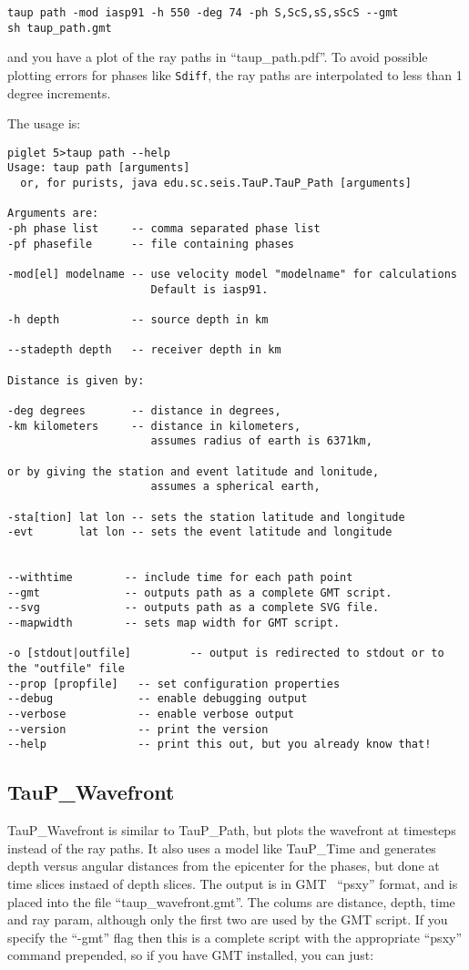 \begin{verbatim}
taup path -mod iasp91 -h 550 -deg 74 -ph S,ScS,sS,sScS --gmt
sh taup_path.gmt
\end{verbatim}

and you have a plot of the ray paths in ``taup\_path.pdf''. To avoid possible plotting errors for
phases like \texttt{Sdiff}, the ray paths are interpolated to less than
1 degree increments.

The usage is:
\begin{verbatim}
piglet 5>taup path --help
Usage: taup path [arguments]
  or, for purists, java edu.sc.seis.TauP.TauP_Path [arguments]

Arguments are:
-ph phase list     -- comma separated phase list
-pf phasefile      -- file containing phases

-mod[el] modelname -- use velocity model "modelname" for calculations
                      Default is iasp91.

-h depth           -- source depth in km

--stadepth depth   -- receiver depth in km

Distance is given by:

-deg degrees       -- distance in degrees,
-km kilometers     -- distance in kilometers,
                      assumes radius of earth is 6371km,

or by giving the station and event latitude and lonitude,
                      assumes a spherical earth,

-sta[tion] lat lon -- sets the station latitude and longitude
-evt       lat lon -- sets the event latitude and longitude


--withtime        -- include time for each path point
--gmt             -- outputs path as a complete GMT script.
--svg             -- outputs path as a complete SVG file.
--mapwidth        -- sets map width for GMT script.

-o [stdout|outfile]         -- output is redirected to stdout or to the "outfile" file
--prop [propfile]   -- set configuration properties
--debug             -- enable debugging output
--verbose           -- enable verbose output
--version           -- print the version
--help              -- print this out, but you already know that!
\end{verbatim}

\subsection{TauP\_Wavefront}
TauP\_Wavefront is similar to TauP\_Path, but plots the wavefront at timesteps instead of the
ray paths. It also uses a model like TauP\_Time and
generates  depth versus
angular distances from the epicenter for the phases, but done at time slices instaed of depth slices.
The output is in GMT~\cite{GMT} ``psxy'' format, and is
placed into the file ``taup\_wavefront.gmt''.
The colums are distance, depth, time and ray param, although only the first two are used by the GMT script.
If you specify the ``-gmt'' flag then this
is a complete script with the appropriate ``psxy'' command prepended, so if you
have GMT installed, you can just:

